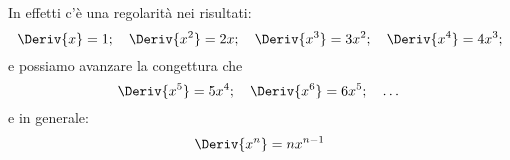 %  

In effetti c'è una regolarità nei risultati:
\[\Deriv{x} = 1; \quad \Deriv{x^2} = 2x; \quad \Deriv{x^3} = 3x^2; \quad 
  \Deriv{x^4} = 4x^3;\]
e possiamo avanzare la congettura che 
\[\Deriv{x^5} = 5x^4; \quad \Deriv{x^6} = 6x^5; \quad \dots\]
e in generale:
\[\Deriv{x^n} = nx^{n-1}\]

